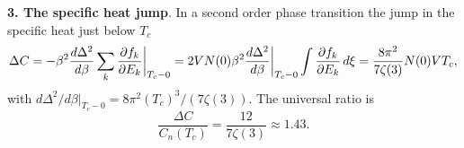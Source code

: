 

\textbf{3.  The specific heat jump}. In a second order phase transition the jump in the specific heat just below $T_c$
\begin{equation*}
	\Delta C = - \beta^2 \frac{d \Delta^2}{d \beta}  \sum_k \frac{\partial f_k}{\partial E_k} \bigg|_{T_c-0} = 2V N(0) \beta^2 \frac{d \Delta^2}{d \beta} \bigg|_{T_c-0}  \int \frac{\partial f_k}{\partial E_k} \, d \xi = \frac{8 \pi^2}{7 \zeta(3)} N(0) V T_c,
\end{equation*}
with $d \Delta^2 / d \beta|_{T_c-0} = 8 \pi^2 (T_c)^3 / (7 \zeta(3))$. The universal ratio is
\begin{equation*}
	\frac{\Delta C}{C_n(T_c)} = \frac{12}{7 \zeta(3)} \approx 1.43.
\end{equation*}

